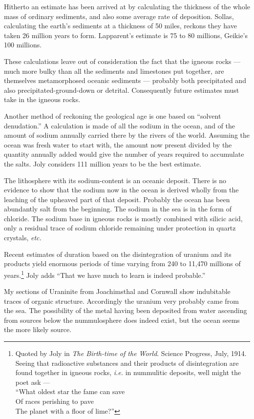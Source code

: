 \documentclass[a4paper, 12pt, oneside]{article}
\begin{document}
Hitherto an estimate has been arrived at by calculating the thickness of the whole mass of ordinary sediments, and also some average rate of deposition. Sollas, calculating the earth's sediments at a thickness of 50 miles, reckons they have taken 26 million years to form. Lapparent's estimate is 75 to 80 millions, Geikie's 100 millions.

These calculations leave out of consideration the fact that the igneous rocks --- much more bulky than all the sediments and limestones put together, are themselves metamorphosed oceanic sediments --- probably both precipitated and also precipitated-ground-down or detrital. Consequently future estimates must take in the igneous rocks.

Another method of reckoning the geological age is one based on ``solvent denudation.'' A calculation is made of all the sodium in the ocean, and of the amount of sodium annually carried there by the rivers of the world. Assuming the ocean was fresh water to start with, the amount now present divided by the quantity annually added would give the number of years required to accumulate the salts. Joly considers 111 million years to be the best estimate.

The lithosphere with its sodium-content is an oceanic deposit. There is no evidence to show that the sodium now in the ocean is derived wholly from the leaching of the upheaved part of that deposit. Probably the ocean has been abundantly salt from the beginning. The sodium in the sea is in the form of chloride. The sodium base in igneous rocks is mostly combined with silicic acid, only a residual trace of sodium chloride remaining under protection in quartz crystals, \emph{etc.}

Recent estimates of duration based on the disintegration of uranium and its products yield enormous periods of time varying from 240 to 11,470 millions of years.\footnote{Quoted by Joly in \emph{The Birth-time of the World}. Science Progress, July, 1914. Seeing that radioactive substances and their products of disintegration are found together in igneous rocks, \emph{i.e.} in nummulitic deposits, well might the poet ask --- \\``What oldest star the fame can save\\Of races perishing to pave\\The planet with a floor of lime?''} Joly adds ``That we have much to learn is indeed probable.''

My sections of Uraninite from Joachimsthal and Cornwall show indubitable traces of organic structure. Accordingly the uranium very probably came from the sea. The possibility of the metal having been deposited from water ascending from sources below the nummulosphere does indeed exist, but the ocean seems the more likely source.
\end{document}
